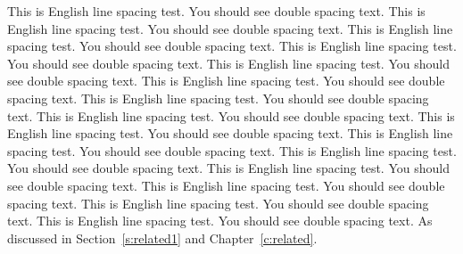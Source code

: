 This is English line spacing test. You should see double spacing text.
This is English line spacing test. You should see double spacing text.
This is English line spacing test. You should see double spacing text.
This is English line spacing test. You should see double spacing text.
This is English line spacing test. You should see double spacing text.
This is English line spacing test. You should see double spacing text.
This is English line spacing test. You should see double spacing text.
This is English line spacing test. You should see double spacing text.
This is English line spacing test. You should see double spacing text.
This is English line spacing test. You should see double spacing text.
This is English line spacing test. You should see double spacing text.
This is English line spacing test. You should see double spacing text.
This is English line spacing test. You should see double spacing text.
This is English line spacing test. You should see double spacing text.
This is English line spacing test. You should see double spacing text.
As discussed in Section~\ref{s:related1} and Chapter~\ref{c:related}.

